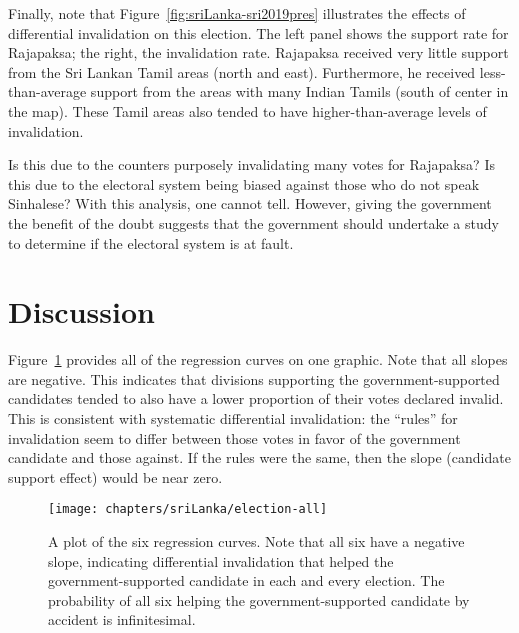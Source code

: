 Finally, note that Figure~\ref{fig:sriLanka-sri2019pres} illustrates the effects of differential invalidation on this election. The left panel shows the support rate for Rajapaksa; the right, the invalidation rate. Rajapaksa received very little support from the Sri Lankan Tamil areas (north and east). Furthermore, he received less-than-average support from the areas with many Indian Tamils (south of center in the map). These Tamil areas also tended to have higher-than-average levels of invalidation.

Is this due to the counters purposely invalidating many votes for Rajapaksa? Is this due to the electoral system being biased against those who do not speak Sinhalese? With this analysis, one cannot tell. However, giving the government the benefit of the doubt suggests that the government should undertake a study to determine if the electoral system is at fault. 


















\section{Discussion}
Figure~\ref{fig:sri-elxAll} provides all of the regression curves on one graphic. Note that all slopes are negative. This indicates that divisions supporting the government-supported candidates tended to also have a lower proportion of their votes declared invalid. This is consistent with systematic differential invalidation: the ``rules'' for invalidation seem to differ between those votes in favor of the government candidate and those against. If the rules were the same, then the slope (candidate support effect) would be near zero.

\begin{figure}[t]
\texttt{[image: chapters/sriLanka/election-all]}
\caption[Invalidation curves for all six elections]{A plot of the six regression curves. Note that all six have a negative slope, indicating differential invalidation that helped the government-supported candidate in each and every election. The probability of all six helping the government-supported candidate by accident is infinitesimal.}
\label{fig:sri-elxAll}
\end{figure}

